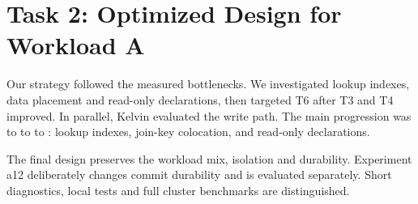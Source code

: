 \section{Task 2: Optimized Design for Workload A}
\label{sec:optimized-a}

Our strategy followed the measured bottlenecks. We investigated lookup indexes,
data placement and read-only declarations, then targeted T6 after T3 and T4
improved. In parallel, Kelvin evaluated the write path. The main progression was
 to  to  to : lookup indexes,
join-key colocation, and read-only declarations.

The final design preserves the workload mix, isolation and durability.
Experiment a12 deliberately changes commit durability and is evaluated separately.
Short diagnostics, local tests and full cluster benchmarks are distinguished.













